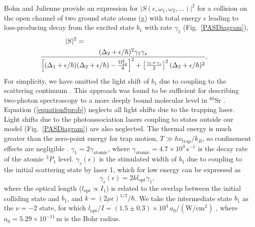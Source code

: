 Bohn and Julienne \cite{bju96} provide an expression for $\vert S(\epsilon,\omega_1,\omega_2,...)\vert^2$ for a collision on the open channel of two ground state atoms (g) with total energy $\epsilon$ leading to loss-producing decay from the excited state $b_1$ with rate $\gamma_1$ (Fig.\ \ref{PASDiagram}),
\begin{eqnarray}\label{equationSprob}
  \vert S\vert^2 =   \hspace{2.5in}&&\\
  {(\Delta_2+\epsilon/\hbar)^2{\gamma}_1{\gamma}_s \over
  	\left[(\Delta_1+\epsilon/\hbar)(\Delta_2+\epsilon/\hbar)-\frac{\Omega_{12}^{2}}{4}\right]^2+\left[ \frac{\gamma_1+\gamma_s}{2}\right]^2(\Delta_2+		 	\epsilon/\hbar)^2}. &&\nonumber
\end{eqnarray}
 For simplicity, we have omitted the light shift of $b_1$ due to coupling to the scattering continuum \cite{bju99}.  This approach was found to be sufficient for describing two-photon spectroscopy to a more deeply bound molecular level in $^{88}$Sr \cite{mmp08}. Equation (\ref{equationSprob}) neglects all light shifts due to the trapping laser. Light shifts due to the photoassociation lasers coupling to states outside our model (Fig.\ \ref{PASDiagram}) are also neglected. The thermal energy is much greater than the zero-point energy for trap motion, $T\gg h\nu_{\text{trap}}/k_B$, so confinement effects are negligible \cite{zbl06}.
${\gamma}_{1}=2\gamma_{\text{atomic}}$, where $\gamma_{\text{atomic}}=4.7\times 10^4$\,s$^{-1}$ is the decay rate of the atomic $^3P_1$ level. ${\gamma}_{s}(\epsilon)$ is the stimulated width of $b_1$ due to coupling to the initial scattering state by laser 1, which for low energy can be expressed as \cite{ctj06,bmc14,Pachomow2017a}
\begin{equation}\label{equationstimulatedwidth}
	{\gamma}_{s}(\epsilon)=2k l_{\text{opt}} \gamma_1,
\end{equation}
where the optical length ($l_{\text{opt}}\propto I_1$) is related to the overlap between the initial colliding state and $b_1$, and $k=(2\mu \epsilon)^{1/2}/\hbar$. We take the intermediate state $b_1$ as the $\nu=-2$ state, for which $l_{\text{opt}}/I=(1.5\pm0.3)\times 10^4\,a_0\mathrm{/(W/cm^2)}$ \cite{bmc14}, where $a_0=5.29\times 10^{-11}$\,m is the Bohr radius.

